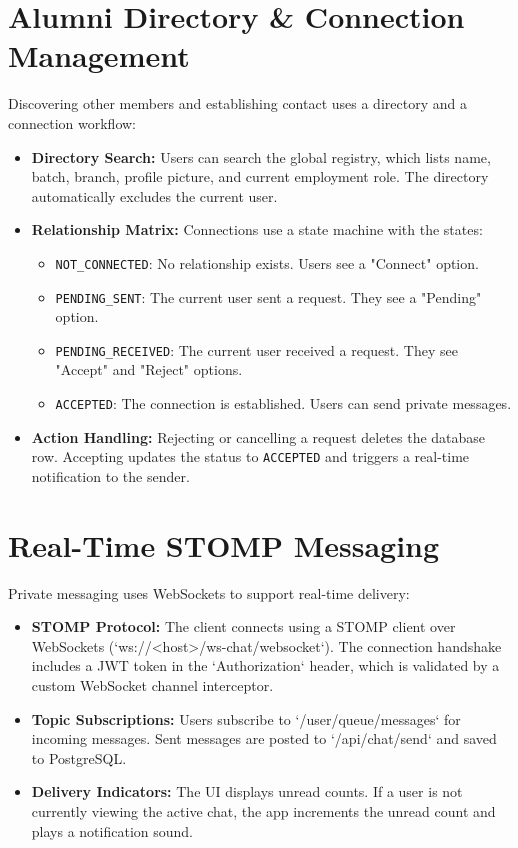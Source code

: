 \section{Alumni Directory \& Connection Management}
Discovering other members and establishing contact uses a directory and a connection workflow:
\begin{itemize}
    \item \textbf{Directory Search:} Users can search the global registry, which lists name, batch, branch, profile picture, and current employment role. The directory automatically excludes the current user.
    \item \textbf{Relationship Matrix:} Connections use a state machine with the states:
    \begin{itemize}
        \item \texttt{NOT\_CONNECTED}: No relationship exists. Users see a "Connect" option.
        \item \texttt{PENDING\_SENT}: The current user sent a request. They see a "Pending" option.
        \item \texttt{PENDING\_RECEIVED}: The current user received a request. They see "Accept" and "Reject" options.
        \item \texttt{ACCEPTED}: The connection is established. Users can send private messages.
    \end{itemize}
    \item \textbf{Action Handling:} Rejecting or cancelling a request deletes the database row. Accepting updates the status to \texttt{ACCEPTED} and triggers a real-time notification to the sender.
\end{itemize}

\section{Real-Time STOMP Messaging}
Private messaging uses WebSockets to support real-time delivery:
\begin{itemize}
    \item \textbf{STOMP Protocol:} The client connects using a STOMP client over WebSockets (`ws://<host>/ws-chat/websocket`). The connection handshake includes a JWT token in the `Authorization` header, which is validated by a custom WebSocket channel interceptor.
    \item \textbf{Topic Subscriptions:} Users subscribe to `/user/queue/messages` for incoming messages. Sent messages are posted to `/api/chat/send` and saved to PostgreSQL.
    \item \textbf{Delivery Indicators:} The UI displays unread counts. If a user is not currently viewing the active chat, the app increments the unread count and plays a notification sound.
\end{itemize}


